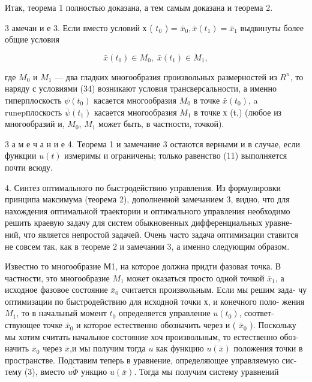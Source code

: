 \documentclass[10pt]{article}
\begin{document}
Итак, теорема 1 полностью доказана, а тем самым доказана и теорема 2.

3 амечан и е 3. Если вместо условий х ( \({t}_{0}\) ) = \({\bar{x}}_{0},\bar{x}\left( {t}_{1}\right)  = {\bar{x}}_{1}\) выдвинуты более общие условия

\[
\bar{x}\left( {t}_{0}\right)  \in  {M}_{0},\;\bar{x}\left( {t}_{1}\right)  \in  {M}_{1}, \tag{34}
\]

где \({M}_{0}\) и \({M}_{1}\) — два гладких многообразия произвольных размерностей из \({R}^{n}\), то наряду с условиями (34) возникают условия трансверсальности, а именно типерплоскость \(\psi \left( {t}_{0}\right)\) касается многообразия \({M}_{0}\) в точке \(\bar{x}\left( {t}_{0}\right)\), a runepплоскость \(\overline{\psi }\left( {t}_{1}\right)\) касается многообразия \({M}_{1}\) в точке х (t,) (любое из многообразий и, \({M}_{0}\), \({M}_{1}\) может быть, в частности, точкой).

3 а м е ч а н и е 4. Теорема 1 и замечание 3 остаются верными и в случае, если функции \(u\left( t\right)\) измеримы и ограничены; только равенство (11) выполняется почти всюду.

4. Синтез оптимального по быстродействию управления. Из формулировки принципа максимума (теорема 2), дополненной замечанием 3, видно, что для нахождения оптимальной траектории и оптимального управления необходимо решить краевую задачу для систем обыкновенных дифференциальных уравне- ний, что является непростой задачей. Очень часто задача оптимизации ставится не совсем так, как в теореме 2 и замечании 3, а именно следующим образом.

Известно то многообразие М1, на которое должна придти фазовая точка. В частности, это многообразие \({M}_{1}\) может оказаться просто одной точкой \({\bar{x}}_{1}\), а исходное фазовое состояние \({\bar{x}}_{0}\) считается произвольным. Если мы решим зада- чу оптимизации по быстродействию для исходной точки х, и конечного поло- жения \({M}_{1}\), то в начальный момент \({t}_{0}\) определяется управление \(u\left( {t}_{0}\right)\), соответ- ствующее точке \({\bar{x}}_{0}\) и которое естественно обозначить через и ( \({\bar{x}}_{0}\) ). Поскольку мы хотим считать начальное состояние хоч произвольным, то естественно обоз- начить \({\bar{x}}_{0}\) через \(\bar{x}\),и мы получим тогда \(u\) как функцию \(u\left( \bar{x}\right)\) положения точки в пространстве. Подставим теперь в уравнение, определяющее управляемую сис- тему (3), вместо \(u\dot{\Phi }\) ункцио \(u\left( \bar{x}\right)\). Тогда мы получим систему уравнений
\end{document}

